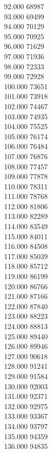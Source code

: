 { 92.000	68987 \\
 93.000	69499 \\
 94.000	70129 \\
 95.000	70925 \\
 96.000	71629 \\
 97.000	71936 \\
 98.000	72333 \\
 99.000	72928 \\
 100.000	73651 \\
 101.000	73918 \\
 102.000	74467 \\
 103.000	74935 \\
 104.000	75525 \\
 105.000	76174 \\
 106.000	76484 \\
 107.000	76876 \\
 108.000	77457 \\
 109.000	77878 \\
 110.000	78311 \\
 111.000	78768 \\
 112.000	81806 \\
 113.000	82289 \\
 114.000	83549 \\
 115.000	84011 \\
 116.000	84508 \\
 117.000	85039 \\
 118.000	85712 \\
 119.000	86199 \\
 120.000	86766 \\
 121.000	87166 \\
 122.000	87840 \\
 123.000	88223 \\
 124.000	88813 \\
 125.000	89440 \\
 126.000	89946 \\
 127.000	90618 \\
 128.000	91241 \\
 129.000	91584 \\
 130.000	92003 \\
 131.000	92371 \\
 132.000	92975 \\
 133.000	93367 \\
 134.000	93797 \\
 135.000	94359 \\
 136.000	94835 \\
}

